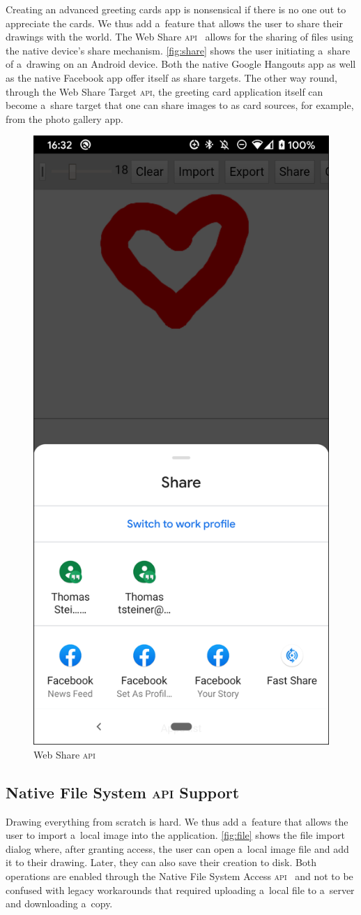 \documentclass[sigconf]{acmart}
\begin{document}
Creating an advanced greeting cards app is nonsensical if there is no one out to appreciate the cards.
We thus add a~feature that allows the user to share their drawings with the world.
The Web Share \textsc{api}~\cite{giuca2017webshare} allows for the sharing of files
using the native device's share mechanism.
\autoref{fig:share} shows the user initiating a~share of a~drawing on an Android device.
Both the native Google Hangouts app as well as the native Facebook app offer itself
as share targets.
The other way round, through the Web Share Target \textsc{api},
the greeting card application itself can become a~share target
that one can share images to as card sources, for example, from the photo gallery app.

\begin{figure}[b]
  \includegraphics[width=0.25\columnwidth]{share.png}
  \caption{Web Share \textsc{api}}
  \label{fig:share}
\end{figure}

\subsection{Native File System \textsc{api} Support}

Drawing everything from scratch is hard.
We thus add a~feature that allows the user to import a~local image into the application.
\autoref{fig:file} shows the file import dialog where, after granting access,
the user can open a~local image file and add it to their drawing.
Later, they can also save their creation to disk.
Both operations are enabled through the Native File System Access \textsc{api}~\cite{kruisselbrink19}
and not to be confused with legacy workarounds that required uploading a~local file to a~server
and downloading a~copy.
\end{document}
